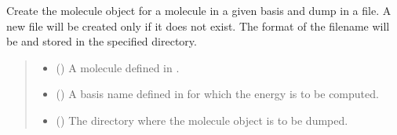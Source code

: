 \documentclass[letterpaper,10pt,english]{sphinxmanual}
\begin{document}
\begin{fulllineitems}
\label{\detokenize{api:MSTOOptpar.DumpStandardBasis}}
\pysigstartsignatures
\pysiglinewithargsret
{}
{\sphinxparamcomma {}\sphinxparamcomma {}\sphinxparamcomma {}}
{}
\pysigstopsignatures
\sphinxAtStartPar
Create the molecule object for a molecule in a given basis and dump in a file. 
A new file will be created only if it does not exist. 
The format of the filename will be  and stored in the specified directory.
\begin{quote}\begin{description}
\begin{itemize}
\item {} 
\sphinxAtStartPar
{} () \textendash{} A molecule defined in .

\item {} 
\sphinxAtStartPar
{} () \textendash{} A basis name defined in  for which the energy is to be computed.

\item {} 
\sphinxAtStartPar
{} () \textendash{} The directory where the molecule object is to be dumped.

\end{itemize}

\end{description}\end{quote}

\begin{sphinxVerbatim}[commandchars=\\\{\}]
  
\end{sphinxVerbatim}

\end{fulllineitems}
\end{document}
